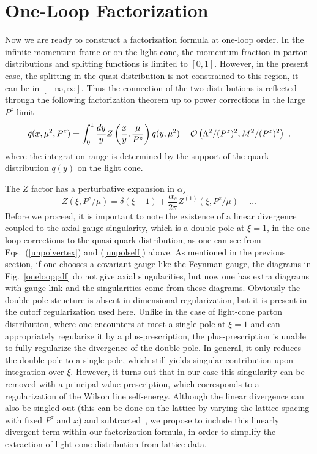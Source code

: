\section{One-Loop Factorization}

Now we are ready to construct a factorization formula at one-loop order. In the infinite momentum frame or on the light-cone, the momentum fraction in
parton distributions and splitting functions is limited to $[0,1]$. However, in the present case, the splitting in
the quasi-distribution is not constrained to this region, it can be in $[-\infty,\infty]$. Thus the connection
of the two distributions is reflected through the following factorization theorem up to power corrections in the large $P^z$ limit
\begin{equation}
    \tilde q(x, \mu^2, P^z)  = \int^1_{0} \frac{dy}{y} Z\left(\frac{x}{y},\frac{\mu}{P^z}\right) q(y, \mu^2) +  {\cal O}\left(\Lambda^2/(P^z)^2,  M^2/(P^z)^2\right)\ ,
\end{equation}
where the integration range is determined
by the support of the quark distribution $q(y)$ on the light cone.

The $Z$ factor has a perturbative expansion in $\alpha_s$
\begin{equation}
             Z(\xi, P^z/\mu) = \delta (\xi-1) + \frac{\alpha_s}{2\pi} Z^{(1)}(\xi, P^z/\mu) + \dots
\end{equation}
Before we proceed, it is important to note the existence of a linear divergence coupled to the axial-gauge singularity, which is a double pole at $\xi=1$, in the one-loop corrections to the quasi quark distribution, as one can see from Eqs.~(\ref{unpolvertex}) and (\ref{unpolself}) above. As mentioned in the previous section, if one chooses a covariant gauge like the Feynman gauge, the diagrams in Fig.~\ref{onelooppdf} do not give axial singularities, but now one has extra diagrams with gauge link and the singularities come from these diagrams. Obviously the double pole structure is absent in dimensional regularization, but it is present in the cutoff regularization used here. Unlike in the case of light-cone parton distribution, where one encounters at most a single pole at $\xi=1$ and can appropriately regularize it by a plus-prescription, the plus-prescription is unable to fully regularize the divergence of the double pole. In general, it only reduces the double pole to a single pole, which still yields singular contribution upon integration over $\xi$. However, it turns out that in our case this singularity can be removed with a principal value prescription, which corresponds to a regularization of the Wilson line self-energy. Although the linear divergence can also be singled out (this can be done on the lattice by varying the lattice spacing with fixed $P^z$ and $x$) and subtracted~\cite{footnote1}, we propose to include this linearly divergent term within our factorization formula, in order to simplify the extraction of light-cone distribution from lattice data.


